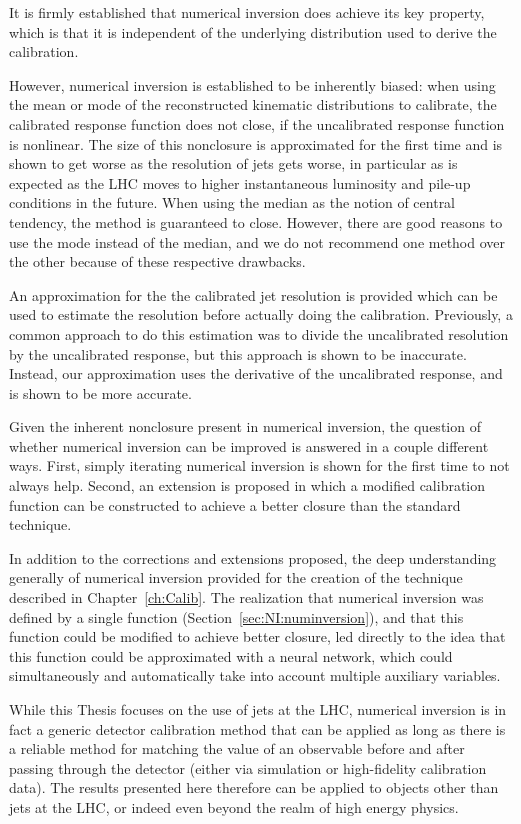 It is firmly established that numerical inversion does achieve its key property, which is that it is independent of the underlying distribution used to derive the calibration.

However, numerical inversion is established to be inherently biased: when using the mean or mode of the reconstructed kinematic distributions to calibrate, the calibrated response function does not close, if the uncalibrated response function is nonlinear.
The size of this nonclosure is approximated for the first time and is shown to get worse as the resolution of jets gets worse, in particular as is expected as the LHC moves to higher instantaneous luminosity and pile-up conditions in the future.
When using the median as the notion of central tendency, the method is guaranteed to close.
However, there are good reasons to use the mode instead of the median, and we do not recommend one method over the other because of these respective drawbacks.

An approximation for the the calibrated jet resolution is provided which can be used to estimate the resolution before actually doing the calibration.
Previously, a common approach to do this estimation was to divide the uncalibrated resolution by the uncalibrated response, but this approach is shown to be inaccurate.
Instead, our approximation uses the derivative of the uncalibrated response, and is shown to be more accurate.

Given the inherent nonclosure present in numerical inversion, the question of whether numerical inversion can be improved is answered in a couple different ways. 
First, simply iterating numerical inversion is shown for the first time to not always help.
Second, an extension is proposed in which a modified calibration function can be constructed to achieve a better closure than the standard technique.

In addition to the corrections and extensions proposed, the deep understanding generally of numerical inversion provided for the creation of the technique described in Chapter~\ref{ch:Calib}.
The realization that numerical inversion was defined by a single function (Section~\ref{sec:NI:numinversion}), and that this function could be modified to achieve better closure, led directly to the idea that this function could be approximated with a neural network, which could simultaneously and automatically take into account multiple auxiliary variables.

While this Thesis focuses on the use of jets at the LHC, numerical inversion is in fact a generic detector calibration method that can be applied as long as there is a reliable method for matching the value of an observable before and after passing through the detector (either via simulation or high-fidelity calibration data).
The results presented here therefore can be applied to objects other than jets at the LHC, or indeed even beyond the realm of high energy physics.

\clearpage
\newpage
